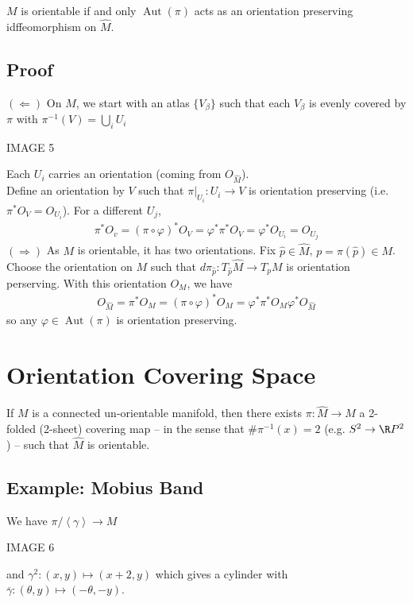 \documentclass[11pt]{article}
\begin{document}
\(M\) is orientable if and only \(\operatorname{Aut}(\pi)\) acts as an orientation preserving idffeomorphism on \(\hat{M}\).\\
\subsection*{Proof}
\label{sec:org8e6bb9b}
\((\Longleftarrow)\) On \(M\), we start with an atlas \(\{V_{\beta}\}\) such that each \(V_{\beta}\) is evenly covered by \(\pi\) with \(\pi^{-1}(V)=\bigcup_{i}U_{i}\)\\
\begin{center}
IMAGE 5\\
\end{center}
Each \(U_{i}\) carries an orientation (coming from \(O_{\hat{M}}\)).\\
Define an orientation by \(V\) such that \(\pi|_{U_{i}}:U_{i}\to V\) is orientation preserving (i.e. \(\pi^{*}O_{V}=O_{U_{i}}\)). For a different \(U_{j}\),\\
\begin{align*}
  \pi^{*}O_{v}
  =(\pi\circ\varphi)^{*}O_{V}
  =\varphi^{*}\pi^{*}O_{V}
  =\varphi^{*}O_{U_{i}}=O_{U_{j}}
\end{align*}
\((\Longrightarrow)\) As \(M\) is orientable, it has two orientations. Fix \(\hat{p}\in\hat{M}\), \(p=\pi(\hat{p})\in M\). Choose the orientation on \(M\) such that \(d\pi_{\hat{p}}:T_{\hat{p}}\hat{M}\to T_{p}M\) is orientation perserving. With this orientation \(O_{M}\), we have\\
\begin{align*}
  O_{\hat{M}}
  =\pi^{*}O_{M}
  =(\pi\circ\varphi)^{*}O_{M}
  =\varphi^{*}\pi^{*}O_{M}
  \varphi^{*}O_{\hat{M}}
\end{align*}
so any \(\varphi\in\operatorname{Aut}(\pi)\) is orientation preserving.\\
\section*{Orientation Covering Space}
\label{sec:org9ca1096}
If \(M\) is a connected un-orientable manifold, then there exists \(\pi:\hat{M}\to M\) a 2-folded (2-sheet) covering map -- in the sense that \(\#\pi^{-1}(x)=2\) (e.g. \(S^{2}\to\R P^{2}\)) -- such that \(\hat{M}\) is orientable.\\
\subsection*{Example: Mobius Band}
\label{sec:orgea06efa}
We have \(\pi/\left\langle \gamma \right\rangle\to M\)\\
\begin{center}
IMAGE 6\\
\end{center}
and \(\gamma^{2}:(x,y)\mapsto(x+2,y)\) which gives a cylinder with \(\overline{\gamma}:(\theta,y)\mapsto(-\theta,-y)\).\\
\end{document}
